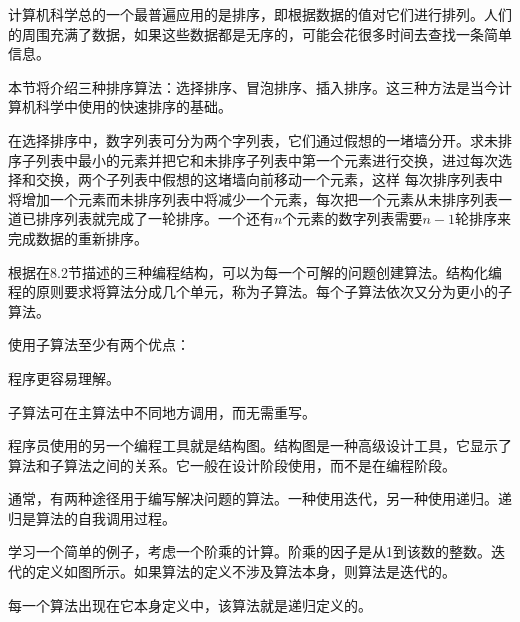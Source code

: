 计算机科学总的一个最普遍应用的是排序，即根据数据的值对它们进行排列。人们的周围充满了数据，如果这些数据都是无序的，可能会花很多时间去查找一条简单信息。

本节将介绍三种排序算法：选择排序、冒泡排序、插入排序。这三种方法是当今计算机科学中使用的快速排序的基础。

在选择排序中，数字列表可分为两个字列表，它们通过假想的一堵墙分开。求未排序子列表中最小的元素并把它和未排序子列表中第一个元素进行交换，进过每次选择和交换，两个子列表中假想的这堵墙向前移动一个元素，这样 每次排序列表中将增加一个元素而未排序列表中将减少一个元素，每次把一个元素从未排序列表一道已排序列表就完成了一轮排序。一个还有$n$个元素的数字列表需要$n-1$轮排序来完成数据的重新排序。

根据在8.2节描述的三种编程结构，可以为每一个可解的问题创建算法。结构化编程的原则要求将算法分成几个单元，称为子算法。每个子算法依次又分为更小的子算法。

使用子算法至少有两个优点：

程序更容易理解。

子算法可在主算法中不同地方调用，而无需重写。

程序员使用的另一个编程工具就是结构图。结构图是一种高级设计工具，它显示了算法和子算法之间的关系。它一般在设计阶段使用，而不是在编程阶段。

通常，有两种途径用于编写解决问题的算法。一种使用迭代，另一种使用递归。递归是算法的自我调用过程。

学习一个简单的例子，考虑一个阶乘的计算。阶乘的因子是从1到该数的整数。迭代的定义如图所示。如果算法的定义不涉及算法本身，则算法是迭代的。

每一个算法出现在它本身定义中，该算法就是递归定义的。

